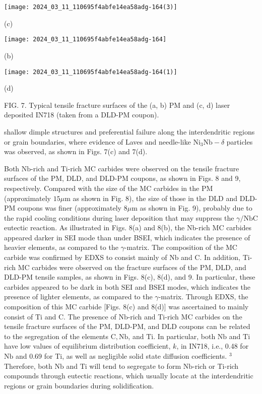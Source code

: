 \documentclass[10pt]{article}
\begin{document}
\begin{center}
\texttt{[image: 2024\_03\_11\_110695f4abfe14ea58adg-164(3)]}
\end{center}

(c)

\begin{center}
\texttt{[image: 2024\_03\_11\_110695f4abfe14ea58adg-164]}
\end{center}

(b)

\begin{center}
\texttt{[image: 2024\_03\_11\_110695f4abfe14ea58adg-164(1)]}
\end{center}

(d)

FIG. 7. Typical tensile fracture surfaces of the (a, b) PM and (c, d) laser deposited IN718 (taken from a DLD-PM coupon).

shallow dimple structures and preferential failure along the interdendritic regions or grain boundaries, where evidence of Laves and needle-like $\mathrm{Ni}_{3} \mathrm{Nb}-\delta$ particles was observed, as shown in Figs. 7(c) and 7(d).

Both $\mathrm{Nb}$-rich and Ti-rich MC carbides were observed on the tensile fracture surfaces of the PM, DLD, and DLD-PM coupons, as shown in Figs. 8 and 9, respectively. Compared with the size of the MC carbides in the PM (approximately $15 \mu \mathrm{m}$ as shown in Fig. 8), the size of those in the DLD and DLD-PM coupons was finer (approximately $8 \mu \mathrm{m}$ as shown in Fig. 9), probably due to the rapid cooling conditions during laser deposition that may suppress the $\gamma / \mathrm{NbC}$ eutectic reaction. As illustrated in Figs. 8(a) and 8(b), the Nb-rich MC carbides appeared darker in SEI mode than under BSEI, which indicates the presence of heavier elements, as compared to the $\gamma$-matrix. The composition of the MC carbide was confirmed by EDXS to consist mainly of $\mathrm{Nb}$ and $\mathrm{C}$. In addition, Ti-rich MC carbides were observed on the fracture surfaces of the PM, DLD, and DLD-PM tensile samples, as shown in Figs. 8(c), 8(d), and 9. In particular, these carbides appeared to be dark in both SEI and BSEI modes, which indicates the presence of lighter elements, as compared to the $\gamma$-matrix. Through EDXS, the composition of this MC carbide [Figs. 8(c) and 8(d)] was ascertained to mainly consist of $\mathrm{Ti}$ and $\mathrm{C}$. The presence of $\mathrm{Nb}$-rich and Ti-rich MC carbides on the tensile fracture surfaces of the PM, DLD-PM, and DLD coupons can be related to the segregation of the elements $\mathrm{C}, \mathrm{Nb}$, and $\mathrm{Ti}$. In particular, both $\mathrm{Nb}$ and $\mathrm{Ti}$ have low values of equilibrium distribution coefficient, $k$, in IN718, i.e., 0.48 for $\mathrm{Nb}$ and 0.69 for Ti, as well as negligible solid state diffusion coefficients. ${ }^{3}$ Therefore, both $\mathrm{Nb}$ and $\mathrm{Ti}$ will tend to segregate to form $\mathrm{Nb}$-rich or Ti-rich compounds through eutectic reactions, which usually locate at the interdendritic regions or grain boundaries during solidification.
\end{document}
